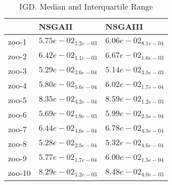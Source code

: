 \documentclass{article}
\begin{document}
\begin{table}
\caption{IGD. Median and Interquartile Range}
\label{table: IGD}
\centering
\begin{scriptsize}
\begin{tabular}{lll}
\hline & NSGAII &  NSGAIII\\
\hline 
zoo-1 & \cellcolor{gray95}$  5.75e-02_{ 1.2e-03}$ & \cellcolor{gray25}$  6.06e-02_{ 8.1e-04}$ \\
zoo-2 & \cellcolor{gray95}$  6.42e-02_{ 1.1e-03}$ & \cellcolor{gray25}$  6.67e-02_{ 1.6e-03}$ \\
zoo-3 & \cellcolor{gray25}$  5.29e-02_{ 3.6e-04}$ & \cellcolor{gray95}$  5.14e-02_{ 3.5e-03}$ \\
zoo-4 & \cellcolor{gray95}$  5.80e-02_{ 5.6e-04}$ & \cellcolor{gray25}$  6.02e-02_{ 1.7e-04}$ \\
zoo-5 & \cellcolor{gray95}$  8.35e-02_{ 4.2e-04}$ & \cellcolor{gray25}$  8.59e-02_{ 1.2e-03}$ \\
zoo-6 & \cellcolor{gray95}$  5.69e-02_{ 1.9e-03}$ & \cellcolor{gray25}$  5.99e-02_{ 2.5e-04}$ \\
zoo-7 & \cellcolor{gray95}$  6.44e-02_{ 4.6e-04}$ & \cellcolor{gray25}$  6.78e-02_{ 4.5e-04}$ \\
zoo-8 & \cellcolor{gray95}$  5.28e-02_{ 2.5e-04}$ & \cellcolor{gray25}$  5.32e-02_{ 4.6e-04}$ \\
zoo-9 & \cellcolor{gray95}$  5.77e-02_{ 1.7e-04}$ & \cellcolor{gray25}$  6.00e-02_{ 1.5e-04}$ \\
zoo-10 & \cellcolor{gray95}$  8.29e-02_{ 1.2e-03}$ & \cellcolor{gray25}$  8.48e-02_{ 4.0e-03}$ \\
\hline
\end{tabular}
\end{scriptsize}
\end{table}
\end{document}
